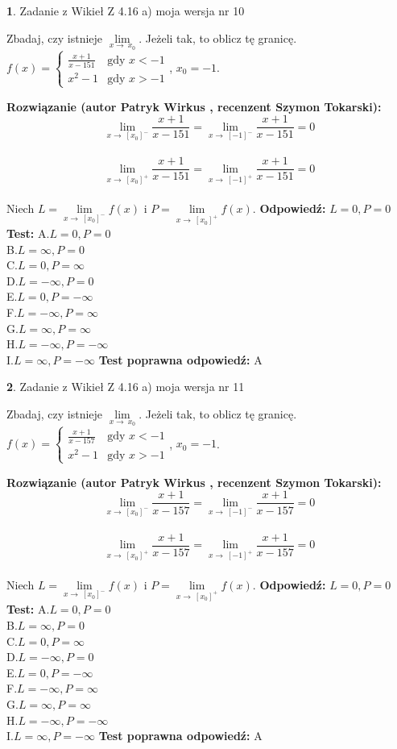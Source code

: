 \documentclass[12pt, a4paper]{article}
\theoremstyle{definition} %
\newtheorem{zad}{}
\newcommand{\zadStart}[1]{\begin{zad}#1\newline}
\newcommand{\zadStop}{\end{zad}}
\newcommand{\rozwStart}[2]{\noindent \textbf{Rozwiązanie (autor #1 , recenzent #2): }\newline}
\newcommand{\rozwStop}{\newline}
\newcommand{\odpStart}{\noindent \textbf{Odpowiedź:}\newline}
\newcommand{\odpStop}{\newline}
\newcommand{\testStart}{\noindent \textbf{Test:}\newline}
\newcommand{\testStop}{\newline}
\newcommand{\kluczStart}{\noindent \textbf{Test poprawna odpowiedź:}\newline}
\newcommand{\kluczStop}{\newline}
\begin{document}
\zadStart{Zadanie z Wikieł Z 4.16 a) moja wersja nr 10}

Zbadaj, czy istnieje $\lim\limits_{x\to\ x_{0}}$. Jeżeli tak, to oblicz tę granicę.\\   $f(x) = \left\{ \begin{array}{ll}
\frac{x+1}{x-151} & \textrm{gdy $x<-1$}\\
x^{2}-1 & \textrm{gdy $x>-1$}
\end{array} \right.$, $x_{0}=-1$.
\zadStop
\rozwStart{Patryk Wirkus}{Szymon Tokarski}
$$\lim\limits_{x\to\ [x_{0}]^{-}}\frac{x+1}{x-151} = \lim\limits_{x\to\ [-1]^{-}}\frac{x+1}{x-151} = 0$$
\\
$$\lim\limits_{x\to\ [x_{0}]^{+}}\frac{x+1}{x-151} = \lim\limits_{x\to\ [-1]^{+}}\frac{x+1}{x-151} = 0$$
\\
Niech $L=\lim\limits_{x\to\ [x_{0}]^{-}}f(x)$ i $P=\lim\limits_{x\to\ [x_{0}]^{+}}f(x)$.
\rozwStop
\odpStart
$L=0, P=0$
\odpStop
\testStart
A.$L=0, P=0$\\ B.$L=\infty, P=0$\\ C.$L=0, P=\infty$\\ D.$L=-\infty, P=0$\\ E.$L=0, P=-\infty$\\
F.$L=-\infty, P=\infty$\\ G.$L=\infty, P=\infty$\\
H.$L=-\infty, P=-\infty$\\
I.$L=\infty, P=-\infty$
\testStop
\kluczStart
A
\kluczStop



\zadStart{Zadanie z Wikieł Z 4.16 a) moja wersja nr 11}

Zbadaj, czy istnieje $\lim\limits_{x\to\ x_{0}}$. Jeżeli tak, to oblicz tę granicę.\\   $f(x) = \left\{ \begin{array}{ll}
\frac{x+1}{x-157} & \textrm{gdy $x<-1$}\\
x^{2}-1 & \textrm{gdy $x>-1$}
\end{array} \right.$, $x_{0}=-1$.
\zadStop
\rozwStart{Patryk Wirkus}{Szymon Tokarski}
$$\lim\limits_{x\to\ [x_{0}]^{-}}\frac{x+1}{x-157} = \lim\limits_{x\to\ [-1]^{-}}\frac{x+1}{x-157} = 0$$
\\
$$\lim\limits_{x\to\ [x_{0}]^{+}}\frac{x+1}{x-157} = \lim\limits_{x\to\ [-1]^{+}}\frac{x+1}{x-157} = 0$$
\\
Niech $L=\lim\limits_{x\to\ [x_{0}]^{-}}f(x)$ i $P=\lim\limits_{x\to\ [x_{0}]^{+}}f(x)$.
\rozwStop
\odpStart
$L=0, P=0$
\odpStop
\testStart
A.$L=0, P=0$\\ B.$L=\infty, P=0$\\ C.$L=0, P=\infty$\\ D.$L=-\infty, P=0$\\ E.$L=0, P=-\infty$\\
F.$L=-\infty, P=\infty$\\ G.$L=\infty, P=\infty$\\
H.$L=-\infty, P=-\infty$\\
I.$L=\infty, P=-\infty$
\testStop
\kluczStart
A
\kluczStop
\end{document}
